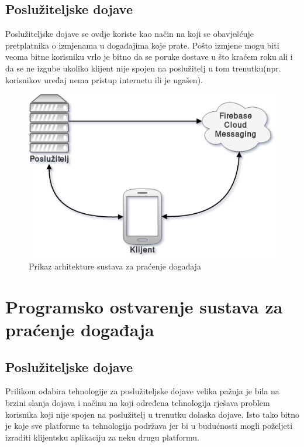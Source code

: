 \documentclass[times, utf8, zavrsni]{fer}
\begin{document}
{\section{Poslužiteljske dojave}
Poslužiteljske dojave se ovdje koriste kao način na koji se obavješćuje pretplatnika o izmjenama u događajima koje prate. Pošto izmjene mogu biti veoma bitne korisniku vrlo je bitno da se poruke dostave u što kraćem roku ali i da se ne izgube ukoliko klijent nije spojen na poslužitelj u tom trenutku(npr. korisnikov uređaj nema pristup internetu ili je ugašen).

\begin{figure}[htb]
\centering
\includegraphics[width=\linewidth]{img/architecture.png}
\caption{Prikaz arhitekture sustava za praćenje događaja}
\label{fig:architecture-image}
\end{figure}

\chapter{Programsko ostvarenje sustava za praćenje događaja}
\label{chp:implementation}

\section{Poslužiteljske dojave}
Prilikom odabira tehnologije za poslužiteljske dojave velika pažnja je bila na brzini slanja dojava i načinu na koji određena tehnologija rješava problem korisnika koji nije spojen na poslužitelj u trenutku dolaska dojave. Isto tako bitno je koje sve platforme ta tehnologija podržava jer bi u budućnosti mogli poželjeti izraditi klijentsku aplikaciju za neku drugu platformu.

}
\end{document}
